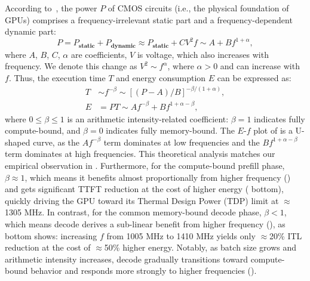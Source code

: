 According to~\cite{gonzalez1997supply}, the power $P$ of CMOS circuits (i.e., the physical foundation of GPUs) comprises a frequency-irrelevant static part and a frequency-dependent dynamic part:
\begin{equation}
    P = P_{\textbf{static}} + P_{\textbf{dynamic}} \approx P_{\textbf{static}} + CV^2f \sim A + B f^{1+\alpha},
\end{equation}
where $A$, $B$, $C$, $\alpha$ are coefficients, $V$ is voltage, which also increases with frequency.
We denote this change as $V^2\sim f^\alpha$, where $\alpha>0$ and can increase with $f$.
Thus, the execution time $T$ and energy consumption $E$ can be expressed as:
\begin{align}
    T &\sim f^{-\beta} \sim \left[(P-A)/B\right]^{-\beta/(1+\alpha)}, \label{eq:t-alpha-beta} \\
    E &= PT \sim A f^{-\beta} + B f^{1+\alpha - \beta}, \label{eq:u-shape} 
\end{align}
where $0\le\beta\le1$ is an arithmetic intensity-related coefficient: 
$\beta=1$ indicates fully compute-bound, and $\beta=0$ indicates fully memory-bound.
The $E$-$f$ plot of  is a U-shaped curve, as the $A f^{-\beta}$ term dominates at low frequencies and the $B f^{1+\alpha - \beta}$ term dominates at high frequencies.
This theoretical analysis matches our empirical observation in .
Furthermore, for the compute-bound prefill phase, $\beta\approx1$, which means it benefits almost proportionally from higher frequency () and gets significant TTFT reduction at the cost of higher energy ( bottom), quickly driving the GPU toward its Thermal Design Power (TDP) limit at $\approx$1305 MHz.
In contrast, for the common memory-bound decode phase, $\beta<1$, which means decode derives a sub-linear benefit from higher frequency (), as  bottom shows:  increasing $f$ from 1005 MHz to 1410 MHz yields only $\approx$20\% ITL reduction at the cost of $\approx$50\% higher energy.
Notably, as batch size grows and arithmetic intensity increases, decode gradually transitions toward compute-bound behavior and responds more strongly to higher frequencies (). 

